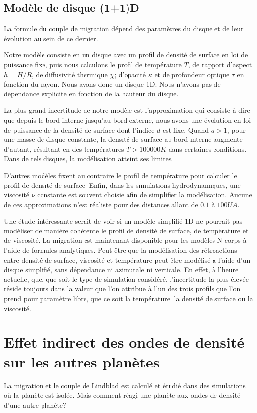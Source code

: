 \subsection{Modèle de disque (1+1)D}
La formule du couple de migration dépend des paramètres du disque et de leur évolution au sein de ce dernier. 

Notre modèle consiste en un disque avec un profil de densité de surface en loi de puissance fixe, puis nous calculons le profil de température $T$, de rapport d'aspect $h=H/R$, de diffusivité thermique $\chi$; d'opacité $\kappa$ et de profondeur optique $\tau$ en fonction du rayon. Nous avons donc un disque 1D. Nous n'avons pas de dépendance explicite en fonction de la hauteur du disque. 

La plus grand incertitude de notre modèle est l'approximation qui consiste à dire que depuis le bord interne jusqu'au bord externe, nous avons une évolution en loi de puissance de la densité de surface dont l'indice $d$ est fixe. Quand $d>1$, pour une masse de disque constante, la densité de surface au bord interne augmente d'autant, résultant en des températures $T>100 000\unit{K}$ dans certaines conditions. Dans de tels disques, la modélisation atteint ses limites.

D'autres modèles fixent au contraire le profil de température pour calculer le profil de densité de surface. Enfin, dans les simulations hydrodynamiques, une viscosité $\nu$ constante est souvent choisie afin de simplifier la modélisation. Aucune de ces approximations n'est réaliste pour des distances allant de $0.1$ à $100\unit{UA}$. 

Une étude intéressante serait de voir si un modèle simplifié 1D ne pourrait pas modéliser de manière cohérente le profil de densité de surface, de température et de viscosité. La migration est maintenant disponible pour les modèles N-corps à l'aide de formules analytiques. Peut-être que la modélisation des rétroactions entre densité de surface, viscosité et température peut être modélisé à l'aide d'un disque simplifié, sans dépendance ni azimutale ni verticale. En effet, à l'heure actuelle, quel que soit le type de simulation considéré, l'incertitude la plus élevée réside toujours dans la valeur que l'on attribue à l'un des trois profils que l'on prend pour paramètre libre, que ce soit la température, la densité de surface ou la viscosité.

\section{Effet indirect des ondes de densité sur les autres planètes}
La migration et le couple de Lindblad est calculé et étudié dans des simulations où la planète est isolée. Mais comment réagi une planète aux ondes de densité d'une autre planète? 

